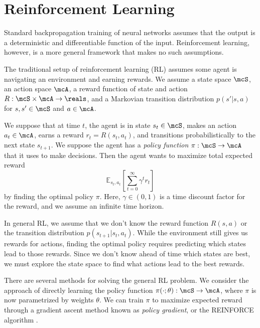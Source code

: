 \documentclass[12pt]{report}
\begin{document}
\section{Reinforcement Learning}

Standard backpropagation training of neural networks assumes that the output is a deterministic and differentiable function of the input. Reinforcement learning, however, is a more general framework that makes no such assumptions.

The traditional setup of reinforcement learning (RL) assumes some agent is navigating an environment and earning rewards.
We assume a state space $\mcS$, an action space $\mcA$, a reward function of state and action $R : \mcS \times \mcA \to \reals$, and a Markovian transition distribution $p(s' | s, a)$ for $s, s' \in \mcS$ and $a \in \mcA$.

We suppose that at time $t$, the agent is in state $s_t \in \mcS$, makes an action $a_t \in \mcA$, earns a reward $r_t = R(s_t, a_t)$, and transitions probabilistically to the next state $s_{t+1}$. We suppose the agent has a \emph{policy function} $\pi : \mcS \to \mcA$ that it uses to make decisions. Then the agent wants to maximize total expected reward
$$\mathbb{E}_{s_t, a_t} \left[\sum_{t=0}^\infty \gamma^t r_t \right]$$
by finding the optimal policy $\pi$. Here, $\gamma \in (0,1)$ is a time discount factor for the reward, and we assume an infinite time horizon.


In general RL, we assume that we don't know the reward function $R(s,a)$ or the transition distribution $p(s_{t+1} | s_t, a_t)$. While the environment still gives us rewards for actions, finding the optimal policy requires predicting which states lead to those rewards.
Since we don't know ahead of time which states are best, we must explore the state space to find what actions lead to the best rewards.

There are several methods for solving the general RL problem.
We consider the approach of directly learning the policy function $\pi( \cdot ; \theta) : \mcS \to \mcA$, where $\pi$ is now parametrized by weights $\theta$. We can train $\pi$  to maximize expected reward through a gradient ascent method known as \emph{policy gradient}, or the REINFORCE algorithm \citep{williams1992reinforce}.
\end{document}

